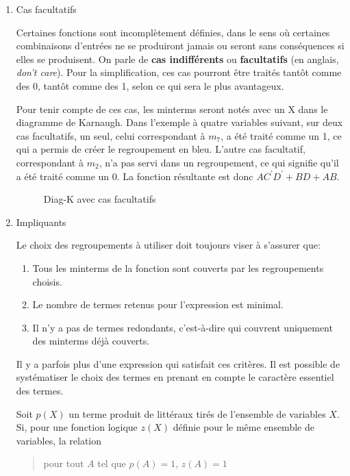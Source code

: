\documentclass[letter, oneside]{book}
\begin{document}
\begin{enumerate}
\item Cas facultatifs
\label{sec:orgeb1ae80}

Certaines fonctions sont incomplètement définies, dans le sens où
certaines combinaisons d'entrées ne se produiront jamais ou seront
sans conséquences si elles se produisent. On parle de \textbf{cas
indifférents} ou \textbf{facultatifs} (en anglais, \emph{don't care}). Pour la
simplification, ces cas pourront être traités tantôt comme des 0,
tantôt comme des 1, selon ce qui sera le plus avantageux.

Pour tenir compte de ces cas, les minterms seront notés avec un X dans
le diagramme de Karnaugh. Dans l'exemple à quatre variables suivant,
sur deux cas facultatifs, un seul, celui correspondant à \(m_{7}\), a
été traité comme un 1, ce qui a permis de créer le regroupement en
bleu. L'autre cas facultatif, correspondant à \(m_{2}\), n'a pas servi
dans un regroupement, ce qui signifie qu'il a été traité comme
un 0. La fonction résultante est donc \(A C^\prime D^\prime + BD + AB\).

\begin{figure}[htbp]
\centering

\caption{\label{fig:org008a1a4}Diag-K avec cas facultatifs}
\end{figure}


\item Impliquants
\label{sec:org6fde5d4}

Le choix des regroupements à utiliser doit toujours viser à s'assurer que:
\begin{enumerate}
\item Tous les minterms de la fonction sont couverts par les regroupements choisis.
\item Le nombre de termes retenus pour l'expression est minimal.
\item Il n'y a pas de termes redondants, c'est-à-dire qui couvrent
uniquement des minterms déjà couverts.
\end{enumerate}

Il y a parfois plus d'une expression qui satisfait ces
critères. Il est possible de systématiser le choix des termes en
prenant en compte le caractère essentiel des termes.

Soit \(p(X)\) un terme produit de littéraux tirés de l'ensemble de
variables \(X\). Si, pour une fonction logique \(z(X)\) définie pour le
même ensemble de variables, la relation

\begin{quote}
pour tout \(A\) tel que \(p(A)=1\), \(z(A)=1\)
\end{quote}


\end{enumerate}
\end{document}
